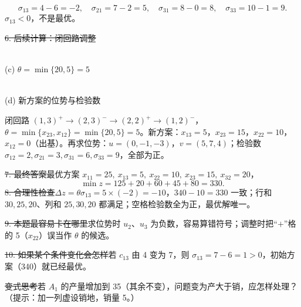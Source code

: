 \[\sigma_{13}=4-6=-2,\quad\sigma_{21}=7-2=5,\quad\sigma_{31}=8-0=8,\quad\sigma_{33}=10-1=9.\]
$\sigma_{13}<0$，不是最优。\par
\st{6. 后续计算：闭回路调整}
\begin{center}
\begin{minipage}{0.48\linewidth}\centering
{}\\{\small (c) $\theta=\min\{20,5\}=5$}
\end{minipage}\hfill
\begin{minipage}{0.48\linewidth}\centering
{}\\{\small (d) 新方案的位势与检验数}
\end{minipage}
\end{center}
闭回路 $(1,3)^+\to(2,3)^-\to(2,2)^+\to(1,2)^-$，$\theta=\min\{x_{23},x_{12}\}=\min\{20,5\}=5$。新方案：$x_{13}=5$，$x_{23}=15$，$x_{22}=10$，$x_{12}=0$（出基）。再求位势：$u=(0,-1,-3)$，$v=(5,7,4)$；检验数 $\sigma_{12}=2,\sigma_{21}=3,\sigma_{31}=6,\sigma_{33}=9$，全部为正。\par
\st{7. 最终答案}最优方案 $x_{11}=25,\ x_{13}=5,\ x_{22}=10,\ x_{23}=15,\ x_{32}=20$，
\[\min z=125+20+60+45+80=330.\]
\st{8. 合理性检查}$\Delta z=\theta\sigma_{13}=5\times(-2)=-10$，$340-10=330$ 一致；行和 $30,25,20$、列和 $25,30,20$ 都满足；空格检验数全为正，最优解唯一。\par
\st{9. 本题最容易卡在哪里}求位势时 $u_2$、$u_3$ 为负数，容易算错符号；调整时把“$+$”格的 5（$x_{22}$）误当作 $\theta$ 的候选。\par
\st{10. 如果某个条件变化会怎样}若 $c_{13}$ 由 4 变为 7，则 $\sigma_{13}=7-6=1>0$，初始方案（340）就已经最优。\par
\st{变式思考}若 $A_1$ 的产量增加到 35（其余不变），问题变为产大于销，应怎样处理？（提示：加一列虚设销地，销量 5。）

